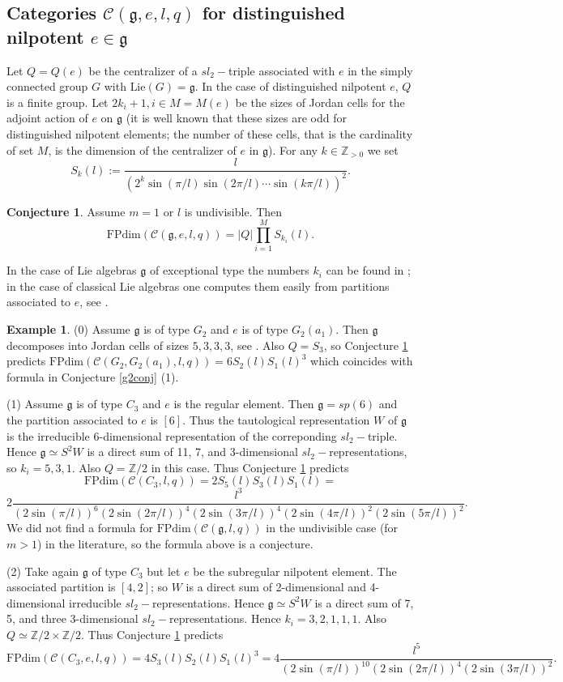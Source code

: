 \documentclass{amsart}
\theoremstyle{definition}
\newtheorem{example}[theorem]{Example}
\newtheorem{conjecture}[theorem]{Conjecture}
\newcommand{\C}{\mathcal{C}}
\newcommand{\Z}{\mathbb{Z}}
\newcommand{\g}{\mathfrak{g}}
\newcommand{\FP}{\text{FPdim}}
\numberwithin{equation}{section}
\begin{document}
\subsection{Categories $\C(\g,e,l,q)$ for distinguished nilpotent $e\in \g$}\label{distconj}
Let $Q=Q(e)$ be the centralizer of a $sl_2-$triple associated with $e$ in the simply
connected group $G$ with $\mbox{Lie}(G)=\g$. In the case of distinguished nilpotent $e$,
$Q$ is a finite group. Let $2k_i+1, i\in M=M(e)$ be the sizes of Jordan cells for
the adjoint action of $e$ on $\g$ (it is well known that these sizes are odd for distinguished
nilpotent elements; the number of these cells, that is the cardinality of set $M$, is
the dimension of the centralizer of $e$ in $\g$). For any $k\in \Z_{>0}$ we set
$$S_k(l):=\frac{l}{(2^k\sin(\pi/l)\sin(2\pi/l)\cdots \sin(k\pi/l))^2}.$$

\begin{conjecture}\label{FPdim}
    Assume $m=1$ or $l$ is undivisible. Then
    $$\FP(\C(\g,e,l,q))=|Q|\prod_{i=1}^MS_{k_i}(l).$$
\end{conjecture}

In the case of Lie algebras $\g$ of exceptional type the numbers $k_i$ can be found
in \cite{St}; in the case of classical Lie algebras one computes them easily from
partitions associated to $e$, see \cite{CMg}. 

\begin{example}
    (0) Assume $\g$ is of type $G_2$ and $e$ is of type $G_2(a_1)$. Then $\g$ decomposes
    into Jordan cells of sizes $5,3,3,3$, see \cite[Table 16]{St}. Also $Q=S_3$, so Conjecture \ref{FPdim} predicts $\FP(\C(G_2, G_2(a_1),l,q))=6S_2(l)S_1(l)^3$ which coincides
    with formula in Conjecture \ref{g2conj} (1).
    

    (1) Assume $\g$ is of type $C_3$ and $e$ is the regular element. Then $\g=sp(6)$
    and the partition associated to $e$ is $[6]$. Thus the tautological representation $W$
    of $\g$ is the irreducible 6-dimensional representation of the correponding $sl_2-$triple.
    Hence $\g \simeq S^2W$ is a direct sum of 11, 7, and 3-dimensional $sl_2-$representations,
    so $k_i=5,3,1$. Also $Q=\Z/2$ in this case. Thus Conjecture \ref{FPdim} predicts 
    $$\FP(\C(C_3,l,q))=2S_{5}(l)S_3(l)S_1(l)=$$ $$2\frac{l^3}{(2\sin(\pi/l))^6(2\sin(2\pi/l))^4(2\sin(3\pi/l))^4(2\sin(4\pi/l))^2(2\sin(5\pi/l))^2}.$$
    We did not find a formula for $\FP(\C(\g,l,q))$ in the undivisible case (for $m>1$)
    in the literature, so the formula above is a conjecture.

    (2) Take again $\g$ of type $C_3$ but let $e$ be the subregular nilpotent element.
    The associated partition is $[4,2]$; so $W$ is a direct sum of 2-dimensional and 4-dimensional irreducible $sl_2-$representations. Hence $\g\simeq S^2W$ is a direct sum
    of 7, 5, and three 3-dimensional $sl_2-$representations. Hence $k_i=3,2,1,1,1$. Also
    $Q\simeq \Z/2\times \Z/2$. Thus Conjecture \ref{FPdim} predicts
    $$\FP(\C(C_3,e,l,q))=4S_{3}(l)S_2(l)S_1(l)^3=4\frac{l^5}{(2\sin(\pi/l))^{10}(2\sin(2\pi/l))^4(2\sin(3\pi/l))^2}.$$
    
\end{example}
\end{document}
